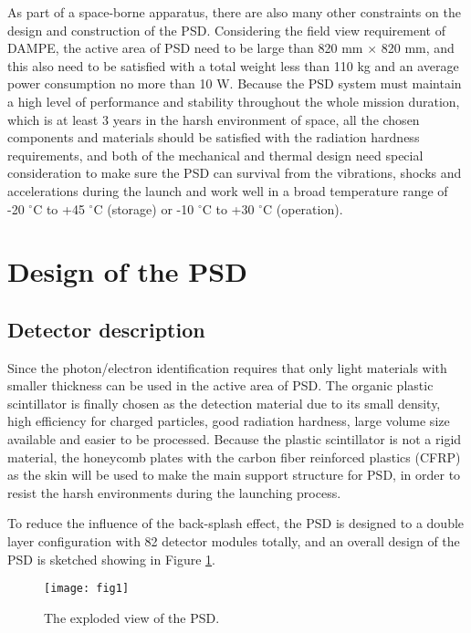 \documentclass[preprint]{elsarticle}
\begin{document}
As part of a space-borne apparatus, there are also many other constraints on the design and construction of the PSD. Considering the field view requirement of DAMPE, the active area of PSD need to be large than 820 mm $\times$ 820 mm, and this also need to be satisfied with a total weight less than 110 kg and an average power consumption no more than 10 W. Because the PSD system must maintain a high level of performance and stability throughout the whole mission duration, which is at least 3 years in the harsh environment of space, all the chosen components and materials should be satisfied with the radiation hardness requirements, and both of the mechanical and thermal design need special consideration to make sure the PSD can survival from the vibrations, shocks and accelerations during the launch and work well in a broad temperature range of -20 $^{\circ}$C to +45 $^{\circ}$C (storage) or -10 $^{\circ}$C to +30 $^{\circ}$C (operation).

\section{Design of the PSD}

\subsection{Detector description}

Since the photon/electron identification requires that only light materials with smaller thickness can be used in the active area of PSD. The organic plastic scintillator is finally chosen as the detection material due to its small density, high efficiency for charged particles, good radiation hardness, large volume size available and easier to be processed. Because the plastic scintillator is not a rigid material, the honeycomb plates with the carbon fiber reinforced plastics (CFRP) as the skin will be used to make the main support structure for PSD, in order to resist the harsh environments during the launching process.

To reduce the influence of the back-splash effect, the PSD is designed to a double layer configuration with 82 detector modules totally, and an overall design of the PSD is sketched showing in Figure \ref{fig:fig1}.

\begin{figure}
 \centering
 \texttt{[image: fig1]}
\caption{The exploded view of the PSD.}
\label{fig:fig1}
\end{figure}
\end{document}
